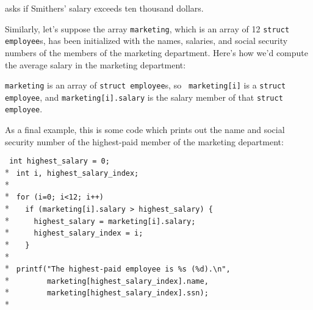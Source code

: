 \begin{flushleft}
\verb% if ( smithers.salary > 10000 ) %  \\*
\verb%   ... % 
\end{flushleft}

\noindent asks if Smithers' salary exceeds ten thousand dollars. 

Similarly, let's suppose the array {\tt marketing}, which is an array of
12 {\tt struct employee}s, has been initialized with the names,
salaries, and social security numbers of the members of the marketing
department.  Here's how we'd compute the average salary in the marketing
department:  


{\tt marketing} is an array of {\tt struct employee}s, so {\tt
marketing[i]} is a {\tt struct employee}, and {\tt marketing[i].salary}
is the salary member of that {\tt struct employee}. 

As a final example, this is some code which prints out the name and
social security number of the highest-paid member of the marketing
department: 

\begin{flushleft}
\verb! int highest_salary = 0;! \\*
\verb! int i, highest_salary_index; ! \\*
\verb! ! \\*
\verb! for (i=0; i<12; i++) ! \\*
\verb!   if (marketing[i].salary > highest_salary) {! \\*
\verb!     highest_salary = marketing[i].salary;! \\*
\verb!     highest_salary_index = i;! \\*
\verb!   }! \\*
\verb! ! \\*
\verb! printf("The highest-paid employee is %s (%d).\n", ! \\*
\verb!        marketing[highest_salary_index].name, ! \\*
\verb!        marketing[highest_salary_index].ssn); ! \\*
\end{flushleft}

